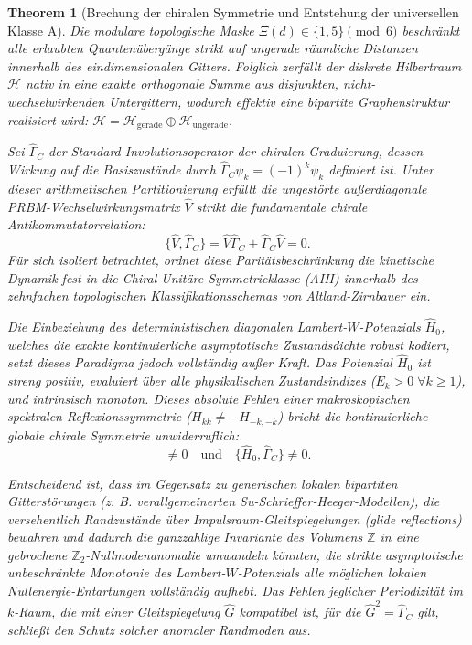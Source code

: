 \documentclass[aps,prl,preprint,superscriptaddress,floatfix]{revtex4-2}
\newtheorem{theorem}{Theorem}[section]
\newcommand{\Hilb}{\mathcal{H}}
\begin{document}
\begin{theorem}[Brechung der chiralen Symmetrie und Entstehung der universellen Klasse A]
\label{thm:chiral_breaking}
Die modulare topologische Maske $\Xi(d) \in \{1,5\} \pmod 6$ beschränkt alle erlaubten Quantenübergänge strikt auf \emph{ungerade} räumliche Distanzen innerhalb des eindimensionalen Gitters. Folglich zerfällt der diskrete Hilbertraum $\Hilb$ nativ in eine exakte orthogonale Summe aus disjunkten, nicht-wechselwirkenden Untergittern, wodurch effektiv eine bipartite Graphenstruktur realisiert wird: $\Hilb = \Hilb_{\text{gerade}} \oplus \Hilb_{\text{ungerade}}$.

Sei $\hat{\Gamma}_C$ der Standard-Involutionsoperator der chiralen Graduierung, dessen Wirkung auf die Basiszustände durch $\hat{\Gamma}_C \psi_k = (-1)^k \psi_k$ definiert ist. Unter dieser arithmetischen Partitionierung erfüllt die ungestörte außerdiagonale PRBM-Wechselwirkungsmatrix $\hat{V}$ strikt die fundamentale chirale Antikommutatorrelation:
\begin{equation}
    \{ \hat{V}, \hat{\Gamma}_C \} = \hat{V}\hat{\Gamma}_C + \hat{\Gamma}_C\hat{V} = 0.
\end{equation}
Für sich isoliert betrachtet, ordnet diese Paritätsbeschränkung die kinetische Dynamik fest in die Chiral-Unitäre Symmetrieklasse (AIII) innerhalb des zehnfachen topologischen Klassifikationsschemas von Altland-Zirnbauer ein.

Die Einbeziehung des deterministischen diagonalen Lambert-$W$-Potenzials $\hat{H}_0$, welches die exakte kontinuierliche asymptotische Zustandsdichte robust kodiert, setzt dieses Paradigma jedoch vollständig außer Kraft. Das Potenzial $\hat{H}_0$ ist streng positiv, evaluiert über alle physikalischen Zustandsindizes ($E_k > 0 \;\forall k \ge 1$), und intrinsisch monoton. Dieses absolute Fehlen einer makroskopischen spektralen Reflexionssymmetrie ($H_{kk} \neq -H_{-k,-k}$) bricht die kontinuierliche globale chirale Symmetrie unwiderruflich:
\begin{equation}
    [\hat{H}_0, \hat{\Gamma}_C] \neq 0 \quad \text{und} \quad \{ \hat{H}_0, \hat{\Gamma}_C \} \neq 0.
\end{equation}

Entscheidend ist, dass im Gegensatz zu generischen lokalen bipartiten Gitterstörungen (z. B. verallgemeinerten Su-Schrieffer-Heeger-Modellen), die versehentlich Randzustände über Impulsraum-Gleitspiegelungen (\textit{glide reflections}) bewahren und dadurch die ganzzahlige Invariante des Volumens $\mathbb{Z}$ in eine gebrochene $\mathbb{Z}_2$-Nullmodenanomalie umwandeln könnten, die strikte asymptotische unbeschränkte Monotonie des Lambert-$W$-Potenzials alle möglichen lokalen Nullenergie-Entartungen vollständig aufhebt. Das Fehlen jeglicher Periodizität im $k$-Raum, die mit einer Gleitspiegelung $\hat{G}$ kompatibel ist, für die $\hat{G}^2 = \hat{\Gamma}_C$ gilt, schließt den Schutz solcher anomaler Randmoden aus.


\end{theorem}
\end{document}
